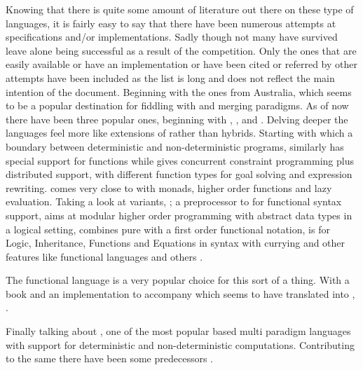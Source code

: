 \documentclass[proposal.tex]{subfiles}
\begin{document}
Knowing that there is quite some amount of literature out there on these type of languages, it is fairly easy to say that there have been numerous 
attempts at specifications and/or implementations. Sadly though not many have survived leave alone being successful as a result of the competition. 
Only the ones that are easily available or have an implementation or have been cited or referred by other attempts have been included as the list is long 
and does not reflect the main intention of the document. Beginning with the ones from Australia, which seems to be a popular destination for fiddling 
with  and merging paradigms. As of now there have been three popular ones, beginning with , 
\cite{website:nue-prolog},  \cite{website:oz-mozart} and  \cite{website:mercury}. 
Delving deeper the languages feel more like extensions of  rather than hybrids. Starting with  which a boundary 
between deterministic and non-deterministic programs, similarly  has special support for functions while  gives  
concurrent constraint programming plus distributed support, with different function types for goal solving and expression rewriting.   
\cite{lloyd1999programming:escher} comes very close to  with monads, higher order functions and lazy evaluation. Taking a look at 
 variants,  \cite{website:ciao}; a preprocessor to  for functional syntax support,  \cite{website:lambda-prolog} aims at modular higher order programming with abstract data types in a logical setting,  \cite{
website:babel,moreno1992logic, moreno1988babel} combines pure  with a first order functional notation,  \cite{
website:life} is for  Logic, Inheritance, Functions and Equations in  syntax with currying and other features like functional languages 
and others \cite{bert1987lpg,malachi1984tablog}.

The functional language  is a very popular choice for this sort of a thing. With a book \cite{friedman05reasoned} and an implementation to accompany \cite{website:kanren,website:minkanren} which seems to have translated into , 
\cite{website:haskellkanren,website:molog,website:minikanrent}. 

Finally talking about , one of the most popular  based multi paradigm languages with support for deterministic and non-deterministic computations. Contributing to the same there have been some predecessors \cite{website:alf,website:toy}.       
\end{document}
